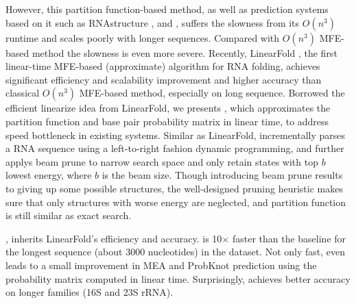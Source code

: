 However, this partition function-based method, 
as well as prediction systems based on it such as RNAstructure \cite{mathews+turner:2006}, \contrafold \cite{do+:2006} and \viennarnafold \cite{lorenz+:2011}, 
suffers the slowness from its $O(n^3)$ runtime and scales poorly with longer sequences. 
Compared with $O(n^3)$ MFE-based method 
the slowness is even more severe.
Recently, LinearFold \cite{Huang+:2019}, 
the first linear-time MFE-based (approximate) algorithm for RNA folding, 
achieves significant efficiency and scalability improvement and higher accuracy than classical $O(n^3)$ MFE-based method, especially on long sequence. 
Borrowed the efficient linearize idea from LinearFold, we presents \linearpartition, 
which approximates the partition function and base pair probability matrix in linear time, to address speed bottleneck in existing systems.
Similar as LinearFold, \linearpartition incrementally parses a RNA sequence using a left-to-right fashion dynamic programming, 
and further applys beam prune \cite{Huang+Sagae:2010} to narrow search space
and only retain states with top $b$ lowest energy, where $b$ is the beam size.
Though introducing beam prune results to giving up some possible structures,
the well-designed pruning heuristic makes sure that only structures with worse energy are neglected,
and partition function is still similar as exact search.


\linearpartition, inherits LinearFold's efficiency and accuracy. \linearpartition is 10$\times$ faster than the baseline \viennarnafold for the longest sequence (about 3000 nucleotides) in the dataset. 
Not only fast, \linearpartition even leads to a small improvement in MEA and ProbKnot prediction using the probability matrix computed in linear time.
Surprisingly, \linearpartition achieves better accuracy on longer families (16S and 23S rRNA).




